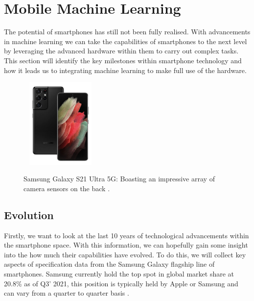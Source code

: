 \documentclass[12pt,a4paper]{report}
\begin{document}
\section{Mobile Machine Learning}

The potential of smartphones has still not been fully realised. With advancements in machine learning we can take the 
capabilities of smartphones to the next level by leveraging the advanced hardware within them to carry out complex 
tasks. This section will identify the key milestones within smartphone technology and how it leads us to integrating 
machine learning to make full use of the hardware.

\begin{figure}[h]\
    \centering
    \includegraphics[width=0.3\textwidth]{s21ultra.jpg}
    \caption{Samsung Galaxy S21 Ultra 5G: Boasting an impressive array of camera sensors on the back \citep{three2021}.}
\end{figure}

\break

\subsection{Evolution}

Firstly, we want to look at the last 10 years of technological advancements within the smartphone space. 
With this information, we can hopefully gain some insight into the how much their capabilities have evolved. To do this, 
we will collect key aspects of specification data from the Samsung Galaxy flagship line of smartphones. Samsung 
currently hold the top spot in global market share at 20.8\% as of Q3' 2021, this position is typically held by Apple or
Samsung and can vary from a quarter to quarter basis \citep{odea2021}.

\par
\end{document}
